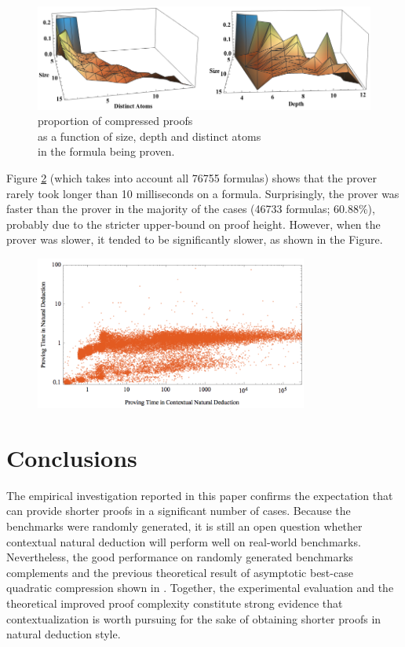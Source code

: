 \documentclass{llncs}
\begin{document}
\begin{figure}[!ht]
  \centering
  \includegraphics[width=\textwidth]{Charts/3DProportion.png}
  \caption{proportion of compressed proofs\\
           as a function of size, depth and distinct atoms\\
           in the formula being proven.} \label{fig:3D}
\end{figure}

\noindent
Figure \ref{fig:Time} (which takes into account all 76755 formulas) shows that the {\ND} prover rarely took longer than 10 milliseconds on a formula. Surprisingly, the {\NDd} prover was faster than the {\ND} prover in the majority of the cases (46733 formulas; 60.88\%), probably due to the stricter upper-bound on proof height. However, when the {\NDd} prover was slower, it tended to be significantly slower, as shown in the Figure. 

\begin{figure}[!ht]
        \centering
        \includegraphics[width=0.8\textwidth]{Charts/Time.png}
        \caption{} \label{fig:Time}
\end{figure}


\section{Conclusions}

The empirical investigation reported in this paper confirms the expectation that {\NDd} can provide shorter proofs in a significant number of cases. Because the benchmarks were randomly generated, it is still an open question whether contextual natural deduction will perform well on real-world benchmarks. Nevertheless, the good performance on randomly generated benchmarks complements and the previous theoretical result of asymptotic best-case quadratic compression shown in \cite{NDc}. Together, the experimental evaluation and the theoretical improved proof complexity constitute strong evidence that contextualization is worth pursuing for the sake of obtaining shorter proofs in natural deduction style. 
\end{document}
